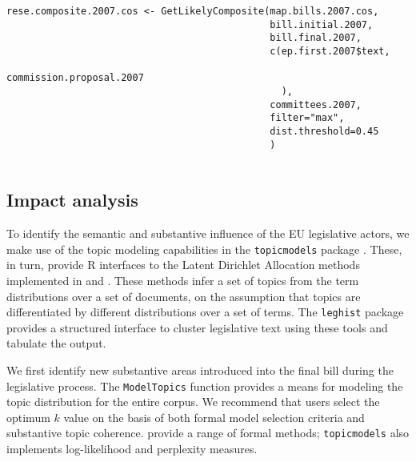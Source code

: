 \documentclass[11pt]{article}
\begin{document}
\begin{lstlisting}
rese.composite.2007.cos <- GetLikelyComposite(map.bills.2007.cos,
                                              bill.initial.2007,
                                              bill.final.2007,
                                              c(ep.first.2007$text,
                                                commission.proposal.2007
                                                ),
                                              committees.2007,
                                              filter="max",
                                              dist.threshold=0.45
                                              )
                       
\end{lstlisting}


\subsection{Impact analysis}
\label{sec:semant-impact-analys}

To identify the semantic and substantive influence of the EU
legislative actors, we make use of the topic modeling capabilities in the
\texttt{topicmodels} package \citep{grun2011topicmodels}. These, in
turn, provide R interfaces to the Latent Dirichlet Allocation methods
implemented in \cite{blei2003latent} and
\cite{blei2006correlated}. These methods infer a set of topics from
the term distributions over a set of documents, on the assumption that
topics are differentiated by different distributions over a set of
terms.  The \texttt{leghist} package
provides a structured interface to cluster legislative text using
these tools and tabulate the output.

We first identify new substantive areas introduced into the final bill
during the legislative process. The \texttt{ModelTopics} function
provides a means for modeling the topic distribution for the entire
corpus. We recommend that users select the optimum $k$ value on the basis of
both formal model selection criteria and substantive topic
coherence. \cite{wallach2009evaluation} provide a range of formal
methods; \texttt{topicmodels} also implements log-likelihood and
perplexity measures. 
\end{document}
